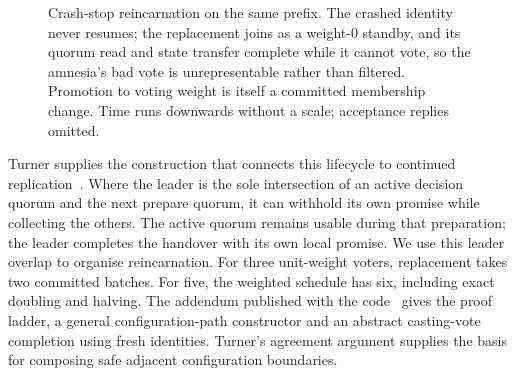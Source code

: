 \documentclass[10pt,journal,letterpaper]{IEEEtran}
\begin{document}
\begin{figure}[t]
\centering
{}
\caption{Crash-stop reincarnation on the same prefix. The crashed identity never resumes; the replacement joins as a weight-0 standby, and its quorum read and state transfer complete while it cannot vote, so the amnesia's bad vote is unrepresentable rather than filtered. Promotion to voting weight is itself a committed membership change. Time runs downwards without a scale; acceptance replies omitted.}
\label{fig:reincarnation-fix}
\end{figure}

Turner supplies the construction that connects this lifecycle to continued
replication~\cite{turner}.
Where the leader is the sole intersection of an active decision quorum and the
next prepare quorum, it can withhold its own promise while collecting the others.
The active quorum remains usable during that preparation; the leader completes
the handover with its own local promise.
We use this leader overlap to organise reincarnation.
For three unit-weight voters, replacement takes two committed batches.
For five, the weighted schedule has six, including exact doubling and halving.
The addendum published with the code~\cite{artifact} gives the proof ladder,
a general configuration-path constructor and an abstract casting-vote
completion using fresh identities. Turner's agreement argument supplies the
basis for composing safe adjacent configuration boundaries.
\end{document}
